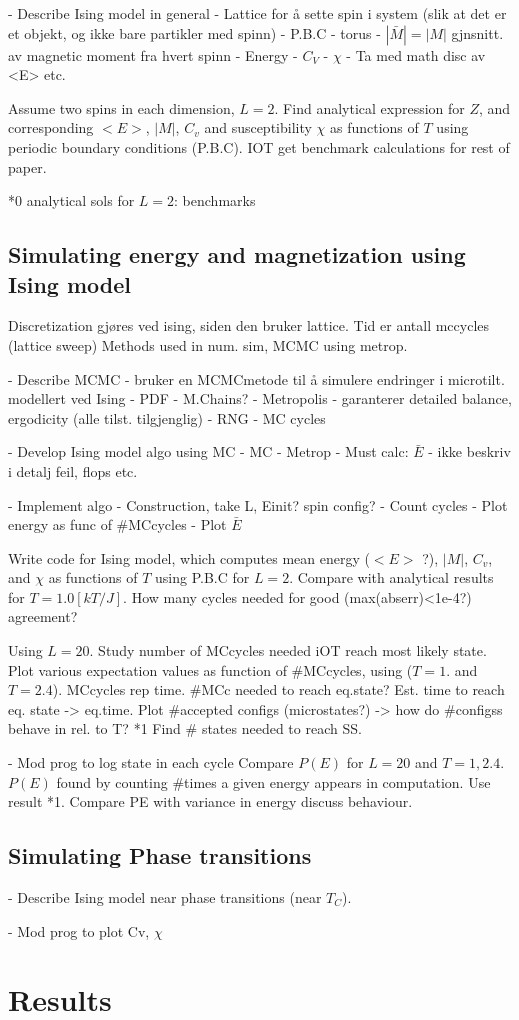 \documentclass[%
oneside,                 %
final,                   %
10pt]{article}
\begin{document}
- Describe Ising model in general
	- Lattice for å sette spin i system (slik at det er et objekt, og ikke bare partikler med spinn)
	- P.B.C - torus
	- $|\bar{M}|=|M|$ gjnsnitt. av magnetic moment fra hvert spinn
	- Energy
	- $C_V$
	- $\chi$
	- Ta med math disc av <E> etc.
	
Assume two spins in each dimension, $L=2$. Find analytical expression for $Z$, and corresponding $<E>$, $|M|$, $C_v$ and susceptibility $\chi$ as functions of $T$ using periodic boundary conditions (P.B.C). IOT get benchmark calculations for rest of paper. \newline

*0 analytical sols for $L=2$: benchmarks

\subsection{Simulating energy and magnetization using Ising model}

Discretization gjøres ved ising, siden den bruker lattice. Tid er antall mccycles (lattice sweep)
Methods used in num. sim, MCMC using metrop.

- Describe MCMC - bruker en MCMCmetode til å simulere endringer i microtilt. modellert ved Ising 
	- PDF
	- M.Chains?
	- Metropolis 
		- garanterer detailed balance, ergodicity (alle tilst. tilgjenglig)
	- RNG
	- MC cycles
	
- Develop Ising model algo using MC 
	- MC
	- Metrop
	- Must calc: $\bar{E}$
	- ikke beskriv i detalj feil, flops etc.
	
- Implement algo
	- Construction, take L, Einit? spin config?
	- Count cycles
	- Plot energy as func of #MCcycles
	- Plot $\bar{E}$
		
Write code for Ising model, which computes mean energy ($<E>$ ?), $|M|$, $C_v$, and $\chi$ as functions of $T$ using P.B.C for $L=2$. Compare with analytical results for $T=1.0 [kT/J]$. How many cycles needed for good (max(abserr)<1e-4?) agreement? \newline

Using $L=20$. Study number of MCcycles needed iOT reach most likely state. Plot various expectation values as function of #MCcycles, using ($T=1.$ and $T=2.4$). MCcycles rep time. #MCc needed to reach eq.state? Est. time to reach eq. state -> eq.time. Plot #accepted configs (microstates?) -> how do #configss behave in rel. to T?
*1 Find # states needed to reach SS. 


- Mod prog to log state in each cycle
Compare $P(E)$ for $L=20$ and $T=1,2.4$. $P(E)$ found by counting #times a given energy appears in computation. Use result *1. Compare PE with variance in energy discuss behaviour.


\subsection{Simulating Phase transitions} 
- Describe Ising model near phase transitions (near $T_C$).

- Mod prog to plot Cv, $\chi$
\section{Results}






\end{document}
